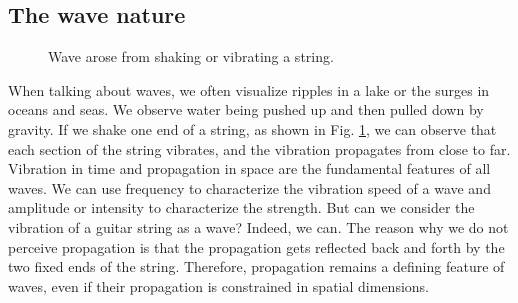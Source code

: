 \documentclass[oneside, letter, 12pt]{book}
\begin{document}
\subsection{The wave nature}
\begin{figure}[h]\label{String}
\caption{Wave arose from shaking or vibrating a string.}
\end{figure}

When talking about waves, we often visualize ripples in a lake or the surges in oceans and seas. We observe water being pushed up and then pulled down by gravity. If we shake one end of a string, as shown in Fig. \ref{String}, we can observe that each section of the string vibrates, and the vibration propagates from close to far. Vibration in time and propagation in space are the fundamental features of all waves. We can use frequency to characterize the vibration speed of a wave and amplitude or intensity to characterize the strength. But can we consider the vibration of a guitar string as a wave? Indeed, we can. The reason why we do not perceive propagation is that the propagation gets reflected back and forth by the two fixed ends of the string. Therefore, propagation remains a defining feature of waves, even if their propagation is constrained in spatial dimensions.
\end{document}
